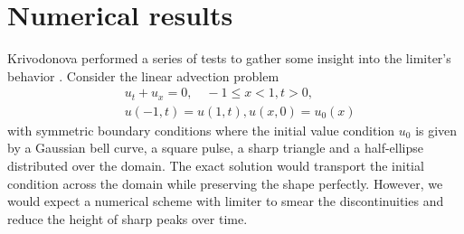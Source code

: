 \section{Numerical results}
\label{sec:results}

Krivodonova performed a series of tests to gather some insight into the limiter's behavior \cite[Section 4]{Krivodonova}.
Consider the linear advection problem
\begin{align*}
  & u_{t} + u_{x} = 0, \quad -1 \le x < 1, t > 0,\\
  & u(-1, t) = u(1, t), u(x, 0) = u_{0}(x)
\end{align*}
with symmetric boundary conditions where the initial value condition $u_{0}$ is given by a Gaussian bell curve, a square pulse, a sharp triangle and a half-ellipse distributed over the domain.
The exact solution would transport the initial condition across the domain while preserving the shape perfectly.
However, we would expect a numerical scheme with limiter to smear the discontinuities and reduce the height of sharp peaks over time.

